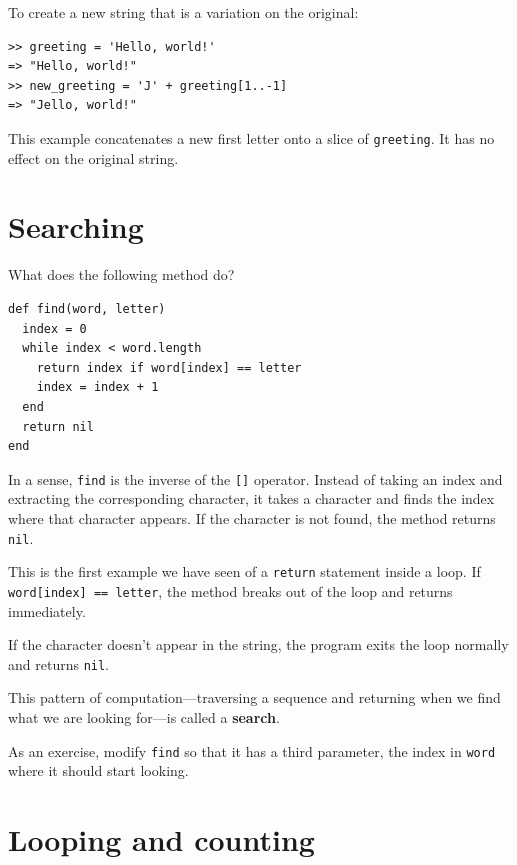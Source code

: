 \documentclass[10pt]{book}
\begin{document}
To create a new string that is a variation on the original:

\begin{verbatim}
>> greeting = 'Hello, world!'
=> "Hello, world!"
>> new_greeting = 'J' + greeting[1..-1]
=> "Jello, world!"
\end{verbatim}
%
This example concatenates a new first letter onto
a slice of {\tt greeting}.  It has no effect on
the original string.


\section{Searching}
\label{find}

What does the following method do?

\begin{verbatim}
def find(word, letter)
  index = 0
  while index < word.length
    return index if word[index] == letter
    index = index + 1
  end
  return nil
end
\end{verbatim}
%
In a sense, {\tt find} is the inverse of the {\tt []} operator.
Instead of taking an index and extracting the corresponding character,
it takes a character and finds the index where that character
appears.  If the character is not found, the method returns {\tt
nil}.

This is the first example we have seen of a {\tt return} statement
inside a loop.  If {\tt word[index] == letter}, the method breaks
out of the loop and returns immediately.

If the character doesn't appear in the string, the program
exits the loop normally and  returns {\tt nil}.

This pattern of computation---traversing a sequence and returning
when we find what we are looking for---is called a {\bf search}.

As an exercise, modify {\tt find} so that it has a
third parameter, the index in {\tt word} where it should start
looking.


\section{Looping and counting}
\label{counter}
\end{document}

